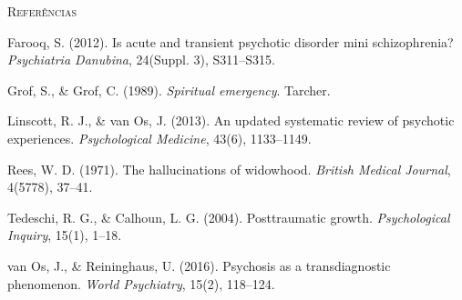 \vspace{2em}
\begin{small}
\noindent\textsc{Referências}

\vspace{1em}
\noindent Farooq, S. (2012). Is acute and transient psychotic disorder mini schizophrenia? \textit{Psychiatria Danubina}, 24(Suppl. 3), S311--S315.

\noindent Grof, S., \& Grof, C. (1989). \textit{Spiritual emergency}. Tarcher.

\noindent Linscott, R. J., \& van Os, J. (2013). An updated systematic review of psychotic experiences. \textit{Psychological Medicine}, 43(6), 1133--1149.

\noindent Rees, W. D. (1971). The hallucinations of widowhood. \textit{British Medical Journal}, 4(5778), 37--41.

\noindent Tedeschi, R. G., \& Calhoun, L. G. (2004). Posttraumatic growth. \textit{Psychological Inquiry}, 15(1), 1--18.

\noindent van Os, J., \& Reininghaus, U. (2016). Psychosis as a transdiagnostic phenomenon. \textit{World Psychiatry}, 15(2), 118--124.
\end{small}
